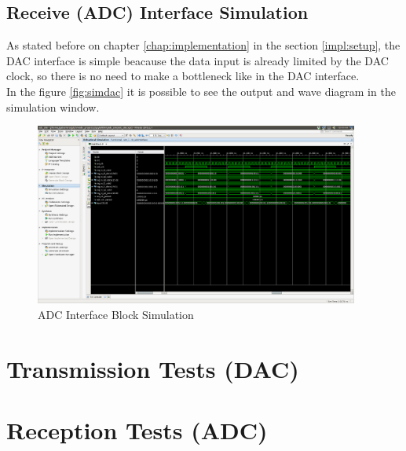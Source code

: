 \subsection{Receive (ADC) Interface Simulation}

As stated before on chapter \ref{chap:implementation} in the section \ref{impl:setup},
the DAC interface is simple beacause the data input is already limited by the DAC
clock, so there is no need to make a bottleneck like in the DAC interface.\\

In the figure \ref{fig:simdac} it is possible to see the output and wave diagram
in the simulation window.

\begin{figure}[htbp]
    \centering
    \includegraphics[width=0.95\textwidth]{./figures/adcInterface}
    \caption{ ADC Interface Block Simulation
    \label{fig:simadc}}
\end{figure}

\section{Transmission Tests (DAC)}
\label{result:dac}

\section{Reception Tests (ADC)}
\label{result:adc}
